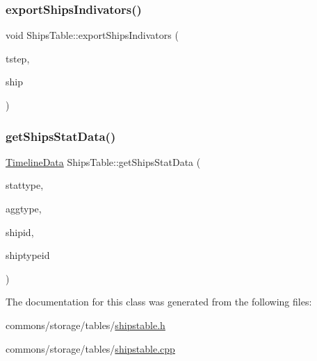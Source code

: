 \mbox{\label{class_ships_table_acb6781e8fa1d587c6a79f08b63d2194f}} 
\subsubsection{\texorpdfstring{exportShipsIndivators()}{exportShipsIndivators()}}
{\footnotesize\ttfamily void Ships\+Table\+::export\+Ships\+Indivators (\begin{DoxyParamCaption}\item[{int}]{tstep,  }\item[{\mbox{\hyperlink{class_ship}{Ship}} $\ast$}]{ship }\end{DoxyParamCaption})}

\mbox{\label{class_ships_table_a0d1779e92f564cd50581e1222a04c1a2}} 
\subsubsection{\texorpdfstring{getShipsStatData()}{getShipsStatData()}}
{\footnotesize\ttfamily \mbox{\hyperlink{struct_timeline_data}{Timeline\+Data}} Ships\+Table\+::get\+Ships\+Stat\+Data (\begin{DoxyParamCaption}\item[{\mbox{\hyperlink{namespacedisplace_1_1plot_a8c50b4d54cafba744b1b5b51b53407e0}{displace\+::plot\+::\+Ships\+Stat}}}]{stattype,  }\item[{\mbox{\hyperlink{namespacedisplace_1_1plot_a522cdc3da3faefae0803944b866e0c3d}{displace\+::plot\+::\+Aggregation\+Type}}}]{aggtype,  }\item[{int}]{shipid,  }\item[{std\+::vector$<$ int $>$}]{shiptypeid }\end{DoxyParamCaption})}



The documentation for this class was generated from the following files\+:\begin{DoxyCompactItemize}
\item 
commons/storage/tables/\mbox{\hyperlink{shipstable_8h}{shipstable.\+h}}\item 
commons/storage/tables/\mbox{\hyperlink{shipstable_8cpp}{shipstable.\+cpp}}\end{DoxyCompactItemize}
